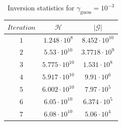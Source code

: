 \documentclass[12pt]{article}
\begin{document}
\begin{table}[H]
		\caption{Inversion statistics for $\gamma_{\text{guess}}= 10^{-3}$} %
		\centering  %
		\begin{tabular}{c c c } %
		\hline \hline                        %
 		$Iteration$&$\mathcal H$ &$|\mathcal G|$   \\ [0.5ex] %
		\hline                  %
                $1$&$1.248\cdot 10^{8}$&$8.452\cdot 10^{10}$   \\
		$2$&$5.53\cdot 10^{10}$&$3.7718\cdot 10^{9}$   \\
                $3$&$5.775\cdot 10^{10}$&$1.531\cdot 10^{8}$   \\
		$4$&$5.917\cdot 10^{10}$&$9.91\cdot 10^{6}$   \\
		$5$&$6.002\cdot 10^{10}$&$7.97\cdot 10^{5}$   \\
	        $6$&$6.05\cdot 10^{10}$&$6.374\cdot 10^{5}$   \\
        	$7$&$6.08\cdot 10^{10}$&$5.06\cdot 10^{4}$   \\
        
                \hline %
		\end{tabular}
		\label{table:gradcheck2} %
		\end{table}
\end{document}
